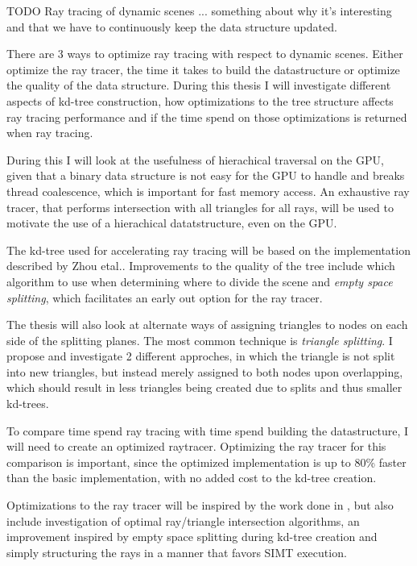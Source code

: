TODO Ray tracing of dynamic scenes ... something about why it's interesting
and that we have to continuously keep the data structure updated.

There are 3 ways to optimize ray tracing with respect to dynamic
scenes. Either optimize the ray tracer, the time it takes to build the
datastructure or optimize the quality of the data structure. During
this thesis I will investigate different aspects of kd-tree
construction, how optimizations to the tree structure affects ray
tracing performance and if the time spend on those optimizations is
returned when ray tracing.

During this I will look at the usefulness of hierachical traversal
on the GPU, given that a binary data structure is not easy for the
GPU to handle and breaks thread coalescence, which is important for
fast memory access. An exhaustive ray tracer, that performs
intersection with all triangles for all rays, will be used to
motivate the use of a hierachical datatstructure, even on the GPU.

The kd-tree used for accelerating ray tracing will be based on the
implementation described by Zhou etal..
Improvements to the quality of the tree include which algorithm to use
when determining where to divide the scene and \textit{empty space
  splitting}, which facilitates an early out option for the ray
tracer. 

The thesis will also look at alternate ways of assigning triangles to
nodes on each side of the splitting planes. The most common technique
is \textit{triangle splitting}. I propose and investigate 2 different
approches, in which the triangle is not split into new triangles, but
instead merely assigned to both nodes upon overlapping, which should
result in less triangles being created due to splits and thus smaller
kd-trees.

To compare time spend ray tracing with time spend building the
datastructure, I will need to create an optimized
raytracer. Optimizing the ray tracer for this comparison is important,
since the optimized implementation is up to 80\% faster than the basic
implementation, with no added cost to the kd-tree creation.

Optimizations to the ray tracer will be inspired by the work done in
, but also include investigation of optimal
ray/triangle intersection algorithms, an improvement inspired by
empty space splitting during kd-tree creation and simply structuring
the rays in a manner that favors SIMT execution.


